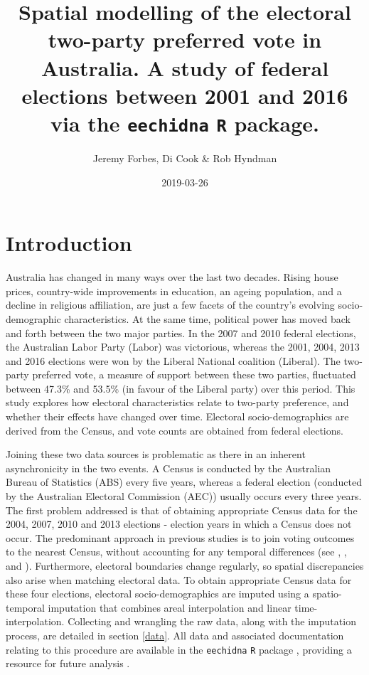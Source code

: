 \documentclass[openany]{book}
\title{Spatial modelling of the electoral two-party preferred vote in Australia. A study of federal elections between 2001 and 2016 via the \texttt{eechidna} \texttt{R} package.}
\author{Jeremy Forbes, Di Cook \& Rob Hyndman}
\date{2019-03-26}
\begin{document}
\maketitle

{
\setcounter{tocdepth}{1}
\tableofcontents
}
\hypertarget{intro}{%
\chapter{Introduction}\label{intro}}

Australia has changed in many ways over the last two decades. Rising house prices, country-wide improvements in education, an ageing population, and a decline in religious affiliation, are just a few facets of the country's evolving socio-demographic characteristics. At the same time, political power has moved back and forth between the two major parties. In the 2007 and 2010 federal elections, the Australian Labor Party (Labor) was victorious, whereas the 2001, 2004, 2013 and 2016 elections were won by the Liberal National coalition (Liberal). The two-party preferred vote, a measure of support between these two parties, fluctuated between 47.3\% and 53.5\% (in favour of the Liberal party) over this period. This study explores how electoral characteristics relate to two-party preference, and whether their effects have changed over time. Electoral socio-demographics are derived from the Census, and vote counts are obtained from federal elections.

Joining these two data sources is problematic as there in an inherent asynchronicity in the two events. A Census is conducted by the Australian Bureau of Statistics (ABS) every five years, whereas a federal election (conducted by the Australian Electoral Commission (AEC)) usually occurs every three years. The first problem addressed is that of obtaining appropriate Census data for the 2004, 2007, 2010 and 2013 elections - election years in which a Census does not occur. The predominant approach in previous studies is to join voting outcomes to the nearest Census, without accounting for any temporal differences (see \citet{DavisStimson98}, \citet{Stimson06}, \citet{Liao09} and \citet{Stimson09}). Furthermore, electoral boundaries change regularly, so spatial discrepancies also arise when matching electoral data. To obtain appropriate Census data for these four elections, electoral socio-demographics are imputed using a spatio-temporal imputation that combines areal interpolation \citep{Goodchild1993} and linear time-interpolation. Collecting and wrangling the raw data, along with the imputation process, are detailed in section \ref{data}. All data and associated documentation relating to this procedure are available in the \texttt{eechidna} \texttt{R} package \citep{eechidna}, providing a resource for future analysis .
\end{document}
